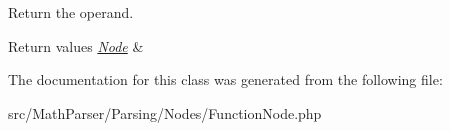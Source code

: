 Return the operand. 


\begin{DoxyRetVals}{Return values}
{\em \hyperlink{classMathParser_1_1Parsing_1_1Nodes_1_1Node}{Node}} & \\
\hline
\end{DoxyRetVals}


The documentation for this class was generated from the following file\-:\begin{DoxyCompactItemize}
\item 
src/\-Math\-Parser/\-Parsing/\-Nodes/Function\-Node.\-php\end{DoxyCompactItemize}
